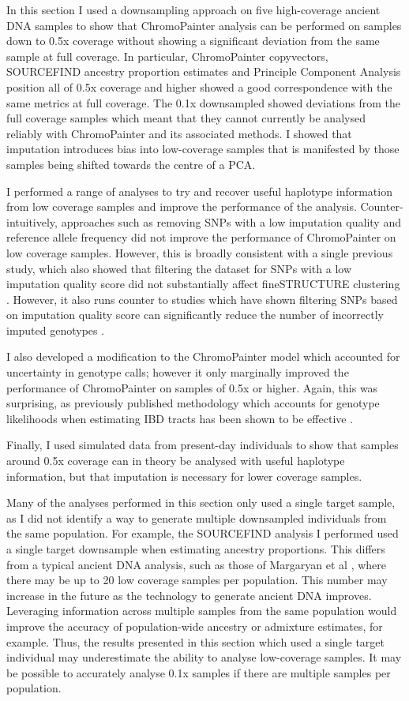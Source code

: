 In this section I used a downsampling approach on five high-coverage ancient DNA samples to show that ChromoPainter analysis can be performed on samples down to 0.5x coverage without showing a significant deviation from the same sample at full coverage. In particular, ChromoPainter copyvectors, SOURCEFIND ancestry proportion estimates and Principle Component Analysis position all of 0.5x coverage and higher showed a good correspondence with the same metrics at full coverage. The 0.1x downsampled showed deviations from the full coverage samples which meant that they cannot currently be analysed reliably with ChromoPainter and its associated methods. I showed that imputation introduces bias into low-coverage samples that is manifested by those samples being shifted towards the centre of a PCA. 

I performed a range of analyses to try and recover useful haplotype information from low coverage samples and improve the performance of the analysis. Counter-intuitively, approaches such as removing SNPs with a low imputation quality and reference allele frequency did not improve the performance of ChromoPainter on low coverage samples. However, this is broadly consistent with a single previous study, which also showed that filtering the dataset for SNPs with a low imputation quality score did not substantially affect fineSTRUCTURE clustering \cite{Martiniano2017}. However, it also runs counter to studies which have shown filtering SNPs based on imputation quality score can significantly reduce the number of incorrectly imputed genotypes \cite{hui2020evaluating}. 

I also developed a modification to the ChromoPainter model which accounted for uncertainty in genotype calls; however it only marginally improved the performance of ChromoPainter on samples of 0.5x or higher. Again, this was surprising, as previously published methodology which accounts for genotype likelihoods when estimating IBD tracts has been shown to be effective \cite{Vieira2016}.

Finally, I used simulated data from present-day individuals to show that samples around 0.5x coverage can in theory be analysed with useful haplotype information, but that imputation is necessary for lower coverage samples.

Many of the analyses performed in this section only used a single target sample, as I did not identify a way to generate multiple downsampled individuals from the same population. For example, the SOURCEFIND analysis I performed  used a single target downsample when estimating ancestry proportions. This differs from a typical ancient DNA analysis, such as those of Margaryan et al \cite{margaryan2020population}, where there may be up to 20 low coverage samples per population. This number may increase in the future as the technology to generate ancient DNA improves. Leveraging information across multiple samples from the same population  would improve the accuracy of population-wide ancestry or admixture estimates, for example. Thus, the results presented in this section which used a single target individual may underestimate the ability to analyse low-coverage samples. It may be possible to accurately analyse 0.1x samples if there are multiple samples per population. 

